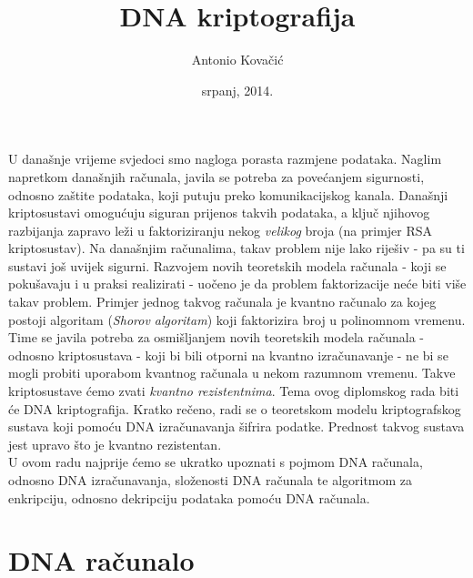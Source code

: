\documentclass[a4paper,oneside,12pt]{memoir} %
\title{DNA kriptografija}
\author{Antonio Kovačić}
\date{srpanj, 2014.}  %
\begin{document}
\frontmatter

\begin{spacing}{1.5}
\begin{intro}

U današnje vrijeme svjedoci smo nagloga porasta razmjene podataka. Naglim napretkom današnjih računala, javila se potreba za povećanjem sigurnosti, odnosno zaštite podataka, koji putuju preko komunikacijskog kanala. Današnji kriptosustavi omogućuju siguran prijenos takvih podataka, a ključ njihovog razbijanja zapravo leži u faktoriziranju nekog \textit{velikog} broja (na primjer \textsc{RSA} kriptosustav). Na današnjim računalima, takav problem nije lako riješiv - pa su ti sustavi još uvijek sigurni. Razvojem novih teoretskih modela računala - koji se pokušavaju i u praksi realizirati - uočeno je da problem faktorizacije neće biti više takav problem. Primjer jednog takvog računala je kvantno računalo za kojeg postoji algoritam (\textit{Shorov algoritam}) koji faktorizira broj u polinomnom vremenu.
Time se javila potreba za osmišljanjem  novih teoretskih modela računala - odnosno kriptosustava - koji bi bili otporni na kvantno izračunavanje - ne bi se mogli probiti uporabom kvantnog računala u nekom razumnom vremenu. Takve kriptosustave ćemo zvati \textit{kvantno rezistentnima}.
Tema ovog diplomskog rada biti će DNA kriptografija. Kratko rečeno, radi se o teoretskom modelu kriptografskog sustava koji pomoću DNA izračunavanja šifrira podatke. Prednost takvog sustava jest upravo što je kvantno rezistentan.\\[0.2cm]
U ovom radu najprije ćemo se ukratko upoznati s pojmom DNA računala, odnosno DNA izračunavanja, složenosti DNA računala te algoritmom za enkripciju, odnosno dekripciju podataka pomoću DNA računala.
\end{intro}
\chapter{DNA računalo}

\end{spacing}
\end{document}
